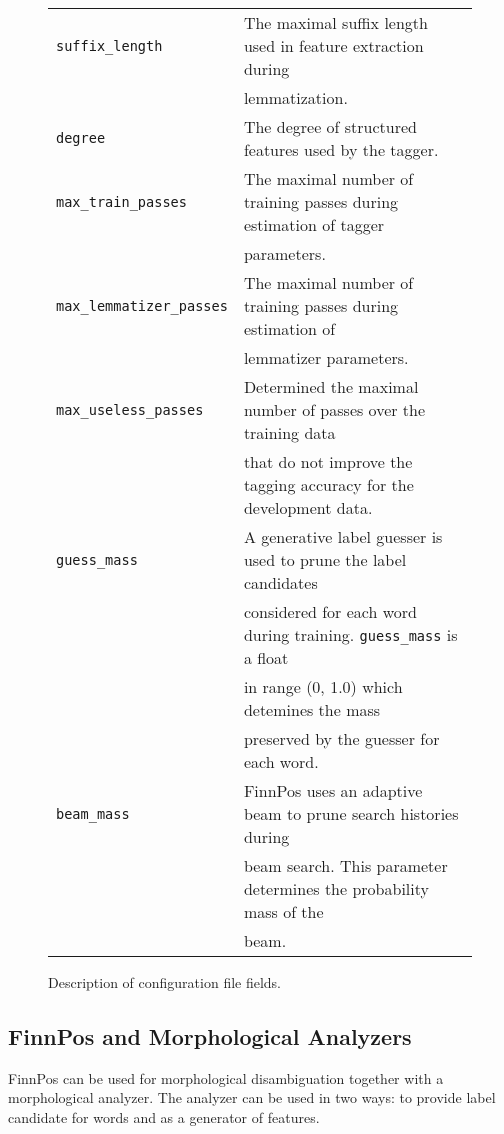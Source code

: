 \documentclass{llncs}
\begin{document}
\begin{figure}
\begin{tabular}{ll}
{\tt suffix\_length} & The maximal suffix length used in feature extraction during\\
                     & lemmatization.\\
{\tt degree} & The degree of structured features used by the tagger. \\
{\tt max\_train\_passes} & The maximal number of training passes during estimation of tagger\\
                         & parameters.\\
{\tt max\_lemmatizer\_passes} & The maximal number of training passes during estimation of\\
                              & lemmatizer parameters.\\
{\tt max\_useless\_passes} & Determined the maximal number of passes over the training data\\
                           & that do not improve the tagging accuracy for the development data.\\
{\tt guess\_mass} & A generative label guesser is used to prune the label candidates\\
                  & considered for each word during training. {\tt guess\_mass} is a float\\
                  & in range (0, 1.0) which detemines the mass \\
                  &  preserved by the guesser for each word.\\
{\tt beam\_mass} & FinnPos uses an adaptive beam to prune search histories during\\
                 & beam search. This parameter determines the probability mass of the\\
                 & beam.
\end{tabular}
\caption{Description of configuration file fields.}\label{fig:config-fields}
\end{figure}

\subsection{FinnPos and Morphological Analyzers}

FinnPos can be used for morphological disambiguation together with a
morphological analyzer. The analyzer can be used in two ways: to
provide label candidate for words and as a generator of features.
\end{document}
